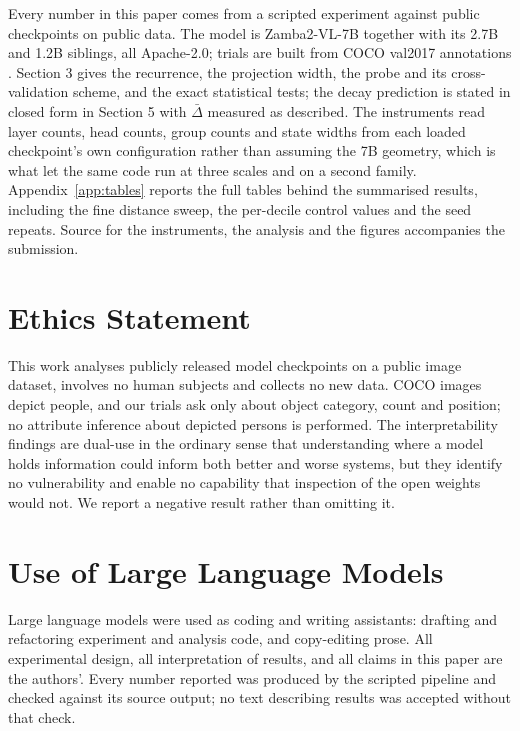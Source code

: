 \documentclass{article}
\begin{document}
Every number in this paper comes from a scripted experiment against public
checkpoints on public data. The model is Zamba2-VL-7B \citep{zamba2vl} together
with its 2.7B and 1.2B siblings, all Apache-2.0; trials are built from COCO
val2017 annotations \citep{lin2014coco}. Section 3 gives the recurrence, the
projection width, the probe and its cross-validation scheme, and the exact
statistical tests; the decay prediction is stated in closed form in Section 5
with $\bar{\Delta}$ measured as described. The instruments read layer counts,
head counts, group counts and state widths from each loaded checkpoint's own
configuration rather than assuming the 7B geometry, which is what let the same
code run at three scales and on a second family. Appendix~\ref{app:tables}
reports the full tables behind the summarised results, including the fine
distance sweep, the per-decile control values and the seed repeats. Source for
the instruments, the analysis and the figures accompanies the submission.

\section*{Ethics Statement}

This work analyses publicly released model checkpoints on a public image
dataset, involves no human subjects and collects no new data. COCO images depict
people, and our trials ask only about object category, count and position; no
attribute inference about depicted persons is performed. The interpretability
findings are dual-use in the ordinary sense that understanding where a model
holds information could inform both better and worse systems, but they identify
no vulnerability and enable no capability that inspection of the open weights
would not. We report a negative result rather than omitting it.

\section*{Use of Large Language Models}

Large language models were used as coding and writing assistants: drafting and
refactoring experiment and analysis code, and copy-editing prose. All
experimental design, all interpretation of results, and all claims in this paper
are the authors'. Every number reported was produced by the scripted pipeline
and checked against its source output; no text describing results was accepted
without that check.
\end{document}
